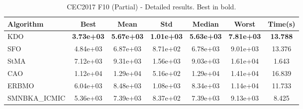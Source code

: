 \begin{table}[H]
\centering\small
\caption{CEC2017 F10 (Partial) - Detailed results. Best in bold.}
\label{tab:cec2017_F10}
\begin{tabular}{lcccccc}
\toprule
\textbf{Algorithm} & \textbf{Best} & \textbf{Mean} & \textbf{Std} & \textbf{Median} & \textbf{Worst} & \textbf{Time(s)} \\
\midrule
KDO & \textbf{3.73e+03} & \textbf{5.67e+03} & \textbf{1.01e+03} & \textbf{5.63e+03} & \textbf{7.81e+03} & \textbf{13.788} \\
SFO & 4.84e+03 & 6.87e+03 & 8.71e+02 & 6.78e+03 & 9.01e+03 & 13.376 \\
StMA & 7.12e+03 & 9.31e+03 & 1.56e+03 & 9.03e+03 & 1.61e+04 & 1.643 \\
CAO & 1.12e+04 & 1.29e+04 & 5.16e+02 & 1.29e+04 & 1.41e+04 & 16.839 \\
ERBMO & 6.04e+03 & 8.48e+03 & 1.08e+03 & 8.34e+03 & 1.14e+04 & 11.733 \\
SMNBKA_ICMIC & 5.36e+03 & 7.39e+03 & 8.37e+02 & 7.39e+03 & 9.13e+03 & 8.425 \\
\bottomrule
\end{tabular}
\end{table}
